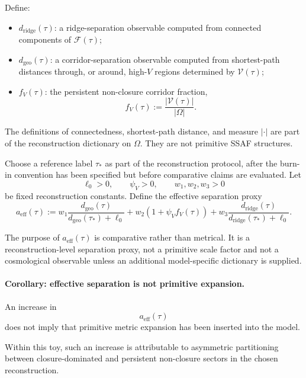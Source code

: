 \documentclass[aps,prx,onecolumn,11pt]{revtex4-2}
\theoremstyle{plain}
\theoremstyle{definition}
\theoremstyle{remark}
\begin{document}
Define:

\begin{itemize}
\item \(d_{\mathrm{ridge}}(\tau)\): a ridge-separation observable
computed from connected components of \(\mathcal F(\tau)\);
\item \(d_{\mathrm{geo}}(\tau)\): a corridor-separation observable
computed from shortest-path distances through, or around, high-\(V\)
regions determined by \(\mathcal V(\tau)\);
\item \(f_V(\tau)\): the persistent non-closure corridor fraction,
\[
f_V(\tau)
:=
\frac{|\mathcal V(\tau)|}{|\Omega|}.
\]
\end{itemize}

The definitions of connectedness, shortest-path distance, and measure
\(|\cdot|\) are part of the reconstruction dictionary on \(\Omega\).
They are not primitive SSAF structures.

Choose a reference label \(\tau_\ast\) as part of the reconstruction
protocol, after the burn-in convention has been specified but before
comparative claims are evaluated. Let
\[
\ell_0>0,
\qquad
\psi_V>0,
\qquad
w_1,w_2,w_3>0
\]
be fixed reconstruction constants. Define the effective separation
proxy
\begin{equation}
a_{\mathrm{eff}}(\tau)
:=
w_1
\frac{
d_{\mathrm{geo}}(\tau)
}{
d_{\mathrm{geo}}(\tau_\ast)+\ell_0
}
+
w_2
\left(
1+\psi_V f_V(\tau)
\right)
+
w_3
\frac{
d_{\mathrm{ridge}}(\tau)
}{
d_{\mathrm{ridge}}(\tau_\ast)+\ell_0
}.
\label{eq:toy_sep_aeff}
\end{equation}

The purpose of \(a_{\mathrm{eff}}(\tau)\) is comparative rather than
metrical. It is a reconstruction-level separation proxy, not a
primitive scale factor and not a cosmological observable unless an
additional model-specific dictionary is supplied.

\paragraph{Corollary: effective separation is not primitive expansion.}

An increase in
\[
a_{\mathrm{eff}}(\tau)
\]
does not imply that primitive metric expansion has been inserted into
the model.

Within this toy, such an increase is attributable to asymmetric
partitioning between closure-dominated and persistent non-closure
sectors in the chosen reconstruction.
\end{document}

